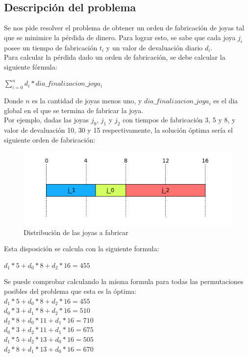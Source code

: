 \subsection{Descripci\'on del problema}

Se nos pide resolver el problema de obtener un orden de fabricaci\'on de joyas tal que se minimice la p\'erdida de dinero. Para lograr esto, se sabe que cada joya $j_{i}$ posee un tiempo de fabricaci\'on $t_{i}$ y un valor de devaluaci\'on diario $d_{i}$. \\

Para calcular la p\'erdida dado un orden de fabricaci\'on, se debe calcular la siguiente f\'ormula:

$\sum\limits_{i=0}^n d_{i}*dia\_finalizacion\_joya_{i}$

Donde $n$ es la cantidad de joyas menos uno, y $dia\_finalizacion\_joya_{i}$ es el dia global en el que se termina de fabricar la joya.\\

Por ejemplo, dadas las joyas $j_{0}$, $j_{1}$ y $j_{2}$ con tiempos de fabricaci\'on 3, 5 y 8, y valor de devaluaci\'on 10, 30 y 15 respectivamente, la soluci\'on \'optima ser\'ia el siguiente orden de fabricaci\'on:

\begin{center}
\begin{figure}[h]
\includegraphics[scale=0.7]{./img/ej2_chart1.png}
\caption{Distribuci\'on de las joyas a fabricar}
\end{figure}
\end{center}

Esta disposici\'on se calcula con la siguiente formula:

$d_{1}*5 + d_{0}*8 + d_{2}*16 = 455$

Se puede comprobar calculando la misma formula para todas las permutaciones posibles del problema que esta es la \'optima: \\

$d_{1}*5 + d_{0}*8 + d_{2}*16 = 455$ \\
$d_{0}*3 + d_{1}*8 + d_{2}*16 = 510$ \\
$d_{2}*8 + d_{0}*11 + d_{1}*16 = 710$ \\
$d_{0}*3 + d_{2}*11 + d_{1}*16 = 675$ \\
$d_{1}*5 + d_{2}*13 + d_{0}*16 = 505$ \\
$d_{2}*8 + d_{1}*13 + d_{0}*16 = 670$ \\

